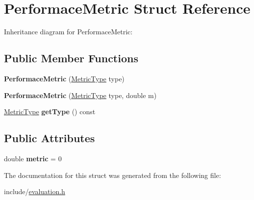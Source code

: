 \hypertarget{structPerformaceMetric}{}\section{Performace\+Metric Struct Reference}
\label{structPerformaceMetric}


Inheritance diagram for Performace\+Metric\+:
\subsection*{Public Member Functions}
\begin{DoxyCompactItemize}
\item 
\mbox{\label{structPerformaceMetric_a89149de45d16d54fe4497dad3a5232f4}} 
{\bfseries Performace\+Metric} (\hyperlink{evaluation_8h_a5a73aada416b5b8e3f549fb0caf28219}{Metric\+Type} type)
\item 
\mbox{\label{structPerformaceMetric_aa184c2e1ff9d5025469d5a2a5d0e8812}} 
{\bfseries Performace\+Metric} (\hyperlink{evaluation_8h_a5a73aada416b5b8e3f549fb0caf28219}{Metric\+Type} type, double m)
\item 
\mbox{\label{structPerformaceMetric_a9d75b590b35e6386fd93dced7d92b58e}} 
\hyperlink{evaluation_8h_a5a73aada416b5b8e3f549fb0caf28219}{Metric\+Type} {\bfseries get\+Type} () const
\end{DoxyCompactItemize}
\subsection*{Public Attributes}
\begin{DoxyCompactItemize}
\item 
\mbox{\label{structPerformaceMetric_acb9d66a88adf36fdf66996bd3dc7a351}} 
double {\bfseries metric} = 0
\end{DoxyCompactItemize}


The documentation for this struct was generated from the following file\+:\begin{DoxyCompactItemize}
\item 
include/\hyperlink{evaluation_8h}{evaluation.\+h}\end{DoxyCompactItemize}
